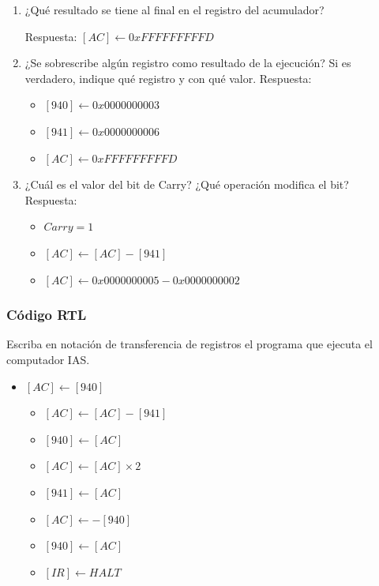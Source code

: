 \documentclass{article}
\begin{document}
\begin{enumerate}
\item ¿Qué resultado se tiene al final en el registro del acumulador?

Respuesta:
\([AC] \leftarrow 0xFFFFFFFFFD\)

\item ¿Se sobrescribe algún registro como resultado de la ejecución? Si
es verdadero, indique qué registro y con qué valor.
Respuesta:
\begin{itemize}
\item \([940] \leftarrow 0x0000000003\)
\item \([941] \leftarrow 0x0000000006\)
\item \([AC] \leftarrow 0xFFFFFFFFFD\)
\end{itemize}

\item ¿Cuál es el valor del bit de Carry? ¿Qué operación modifica el bit?
Respuesta:
\begin{itemize}
\item \(Carry = 1\)

\item \([AC] \leftarrow [AC]-[941]\)
\item \([AC] \leftarrow 0x0000000005-0x0000000002\)
\end{itemize}
\end{enumerate}

\subsubsection{Código RTL}
\label{sec:org9ea9cce}

Escriba en notación de transferencia de registros el programa que
ejecuta el computador IAS.

\begin{itemize}
\item \([AC] \leftarrow [940]\)
\begin{itemize}
\item \([AC] \leftarrow [AC]-[941]\)
\item \([940] \leftarrow [AC]\)
\item \([AC] \leftarrow [AC]\times 2\)
\item \([941] \leftarrow [AC]\)
\item \([AC] \leftarrow -[940]\)
\item \([940] \leftarrow [AC]\)
\item \([IR] \leftarrow HALT\)
\end{itemize}
\end{itemize}
\end{document}
